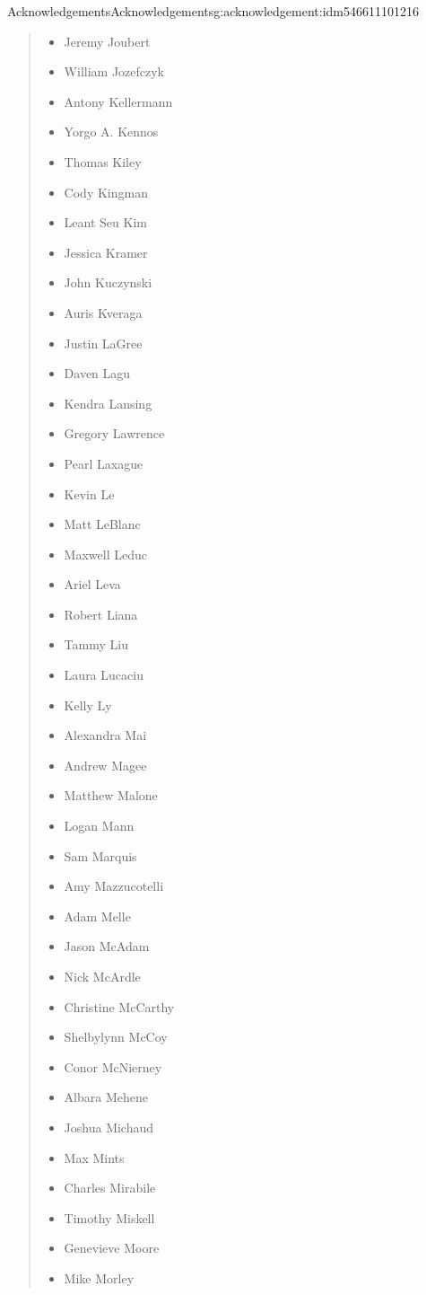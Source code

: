 \documentclass[oneside,10pt,]{book}
\numberwithin{equation}{section}
\begin{document}
\begin{acknowledgement}{Acknowledgements}{}{Acknowledgements}{}{}{g:acknowledgement:idm546611101216}
\begin{quote}
\begin{multicols}{2}
\begin{itemize}[label=\textbullet]
\item{}Jeremy Joubert%
\item{}William Jozefczyk%
\item{}Antony Kellermann%
\item{}Yorgo A. Kennos%
\item{}Thomas Kiley%
\item{}Cody Kingman%
\item{}Leant Seu Kim%
\item{}Jessica Kramer%
\item{}John Kuczynski%
\item{}Auris Kveraga%
\item{}Justin LaGree%
\item{}Daven Lagu%
\item{}Kendra Lansing%
\item{}Gregory Lawrence%
\item{}Pearl Laxague%
\item{}Kevin Le%
\item{}Matt LeBlanc%
\item{}Maxwell Leduc%
\item{}Ariel Leva%
\item{}Robert Liana%
\item{}Tammy Liu%
\item{}Laura Lucaciu%
\item{}Kelly Ly%
\item{}Alexandra Mai%
\item{}Andrew Magee%
\item{}Matthew Malone%
\item{}Logan Mann%
\item{}Sam Marquis%
\item{}Amy Mazzucotelli%
\item{}Adam Melle%
\item{}Jason McAdam%
\item{}Nick McArdle%
\item{}Christine McCarthy%
\item{}Shelbylynn McCoy%
\item{}Conor McNierney%
\item{}Albara Mehene%
\item{}Joshua Michaud%
\item{}Max Mints%
\item{}Charles Mirabile%
\item{}Timothy Miskell%
\item{}Genevieve Moore%
\item{}Mike Morley%

\end{itemize}
\end{multicols}
\end{quote}
\end{acknowledgement}
\end{document}
